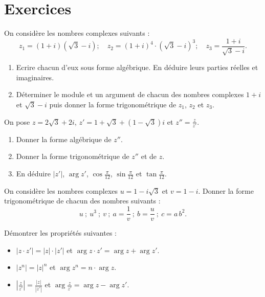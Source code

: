 \TCDLessonStyleOff
\clearpage
\providecommand{\Arg}[1]{\mathrm{Arg}\left( #1 \right)}
\section{Exercices}
%
\begin{exo}
      On consid\`ere les nombres complexes suivants :
            \[
                  z_1 = (1+i) (\sqrt{3}-i)
 ; \quad
                  z_2 = (1+i)^4 \cdot (\sqrt{3}-i)^3
 ; \quad
                  z_3 = \frac{1+i}{\sqrt{3}-i}
                  .
            \]
      \begin{enumerate}
            \item Ecrire chacun d'eux sous forme alg\'ebrique.
                  En d\'eduire leurs parties r\'eelles et imaginaires.
            \item D\'eterminer le module et un argument de chacun des nombres complexes $1+i$ et $\sqrt{3}-i$
                  puis donner la forme trigonom\'etrique de $z_1$, $z_2$ et $z_3$.
      \end{enumerate}
\end{exo}
%
\begin{exo}
      On pose $z=2\sqrt{3} + 2i$, $z' = 1 + \sqrt{3} + (1-\sqrt{3})i$ et $z'' = \frac{z}{z'}$.
      \begin{enumerate}
            \item Donner la forme alg\'ebrique de $z''$.
            \item Donner la forme trigonom\'etrique de $z''$ et de $z$.
            \item En d\'eduire $|z'|$, $\arg z'$, $\cos \frac{\pi}{12}$, $\sin \frac{\pi}{12}$ et $\tan \frac{\pi}{12}$.
      \end{enumerate}
\end{exo}
%
\begin{exo}
	On consid\`ere les nombres complexes $u = 1 - i \sqrt{3}$ et $v = 1 - i$.
	Donner la forme trigonom\'etrique de chacun des nombres suivants :
	\[
		u 						\ ; \
		u^3						\ ; \
		v						\ ; \
		a = \frac{1}{v}		\ ; \
		b = \frac{u}{v}		\ ; \
		c = a \, b^2			.
	\]
\end{exo}
%
\begin{exo}
	D\'emontrer les propri\'et\'es suivantes : 
	\begin{itemize}
		\item $|z \cdot z'| = |z| \cdot |z'|$ et $\arg{z \cdot z'} = \arg{z} + \arg{z'}$.
		\item $|z^n| = |z|^n$ et $\arg{z^n} = n \cdot \arg{z}$.
		\item $\left| \frac{z}{z'} \right| = \frac{|z|}{|z'|}$ et $\arg{\frac{z}{z'}} = \arg{z} - \arg{z'}$.
	\end{itemize}
\end{exo}
